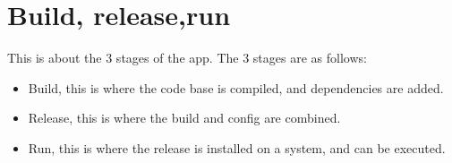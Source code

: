 \section*{Build, release,run}
This is about the 3 stages of the app.
The 3 stages are as follows:

\begin{itemize}
\item Build, this is where the code base is compiled, and dependencies are added.
\item Release, this is where the build and config are combined.
\item Run, this is where the release is installed on a system, and can be executed.
\end{itemize}